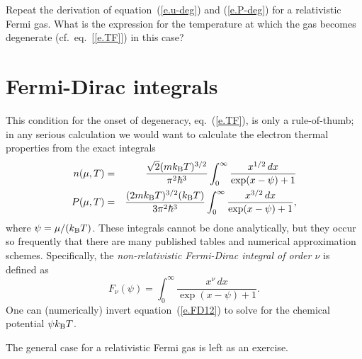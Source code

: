 \begin{exercisebox}
Repeat the derivation of equation~(\ref{e.u-deg}) and (\ref{e.P-deg}) for  a relativistic Fermi gas. What is the expression for the temperature at which the gas becomes degenerate (cf.~eq.~[\ref{e.TF}]) in this case?
\end{exercisebox}

\section{Fermi-Dirac integrals}
This condition for the onset of degeneracy, eq.~(\ref{e.TF}), is only a rule-of-thumb; in any serious calculation we would want to calculate the electron thermal properties from the exact integrals
\begin{eqnarray}\label{e.FD12}
n(\mu,T) &=& \frac{\sqrt{2}(mk_\mathrm{B} T)^{3/2}}{\pi^{2}\hbar^{3}}\int_{0}^{\infty} \frac{x^{1/2}\,dx}{\exp(x-\psi)+1} \\
P(\mu,T) &=& \frac{(2mk_\mathrm{B} T)^{3/2}(k_\mathrm{B} T)}{3\pi^{2}\hbar^{3}}\int_{0}^{\infty} \frac{x^{3/2}\,dx}{\exp(x-\psi)+1},
\end{eqnarray}
where $\psi = \mu/(k_\mathrm{B} T)$.  These integrals cannot be done analytically, but they occur so frequently that there are many published tables and numerical approximation schemes\cite{timmes.swesty:accuracy}.  Specifically, the \emph{non-relativistic Fermi-Dirac integral of order $\nu$} is defined as
\begin{equation}\label{e.FDintegral}
F_{\nu}(\psi) = \int_{0}^{\infty}\frac{ x^{\nu}\,dx}{\exp(x-\psi)+1}.
\end{equation}
One can (numerically) invert equation~(\ref{e.FD12}) to solve for the chemical potential $\psi k_\mathrm{B} T$.

The general case for a relativistic Fermi gas is left as an exercise.


